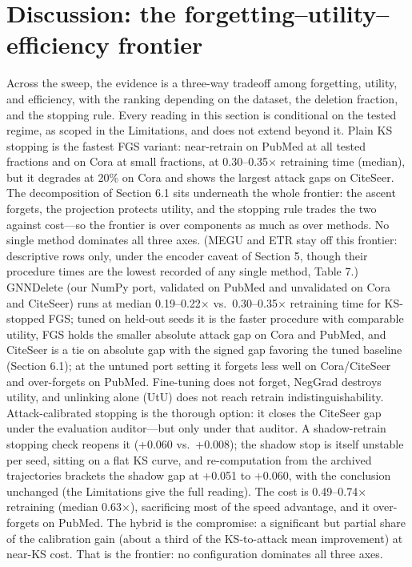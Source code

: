 \documentclass[pdflatex,sn-basic,Numbered]{sn-jnl}
\begin{document}
\section{Discussion: the forgetting--utility--efficiency frontier}
Across the sweep, the evidence is a three-way tradeoff among forgetting, utility, and efficiency, with the ranking depending on the dataset, the deletion fraction, and the stopping rule. Every reading in this section is conditional on the tested regime, as scoped in the Limitations, and does not extend beyond it. Plain KS stopping is the fastest FGS variant: near-retrain on PubMed at all tested fractions and on Cora at small fractions, at 0.30--0.35$\times$ retraining time (median), but it degrades at 20\% on Cora and shows the largest attack gaps on CiteSeer. The decomposition of Section 6.1 sits underneath the whole frontier: the ascent forgets, the projection protects utility, and the stopping rule trades the two against cost---so the frontier is over components as much as over methods. No single method dominates all three axes. (MEGU and ETR stay off this frontier: descriptive rows only, under the encoder caveat of Section 5, though their procedure times are the lowest recorded of any single method, Table 7.) GNNDelete (our NumPy port, validated on PubMed and unvalidated on Cora and CiteSeer) runs at median 0.19--0.22$\times$ vs.\ 0.30--0.35$\times$ retraining time for KS-stopped FGS; tuned on held-out seeds it is the faster procedure with comparable utility, FGS holds the smaller absolute attack gap on Cora and PubMed, and CiteSeer is a tie on absolute gap with the signed gap favoring the tuned baseline (Section 6.1); at the untuned port setting it forgets less well on Cora/CiteSeer and over-forgets on PubMed. Fine-tuning does not forget, NegGrad destroys utility, and unlinking alone (UtU) does not reach retrain indistinguishability. Attack-calibrated stopping is the thorough option: it closes the CiteSeer gap under the evaluation auditor---but only under that auditor. A shadow-retrain stopping check reopens it (+0.060 vs.\ +0.008); the shadow stop is itself unstable per seed, sitting on a flat KS curve, and re-computation from the archived trajectories brackets the shadow gap at +0.051 to +0.060, with the conclusion unchanged (the Limitations give the full reading). The cost is 0.49--0.74$\times$ retraining (median 0.63$\times$), sacrificing most of the speed advantage, and it over-forgets on PubMed. The hybrid is the compromise: a significant but partial share of the calibration gain (about a third of the KS-to-attack mean improvement) at near-KS cost. That is the frontier: no configuration dominates all three axes.
\end{document}
